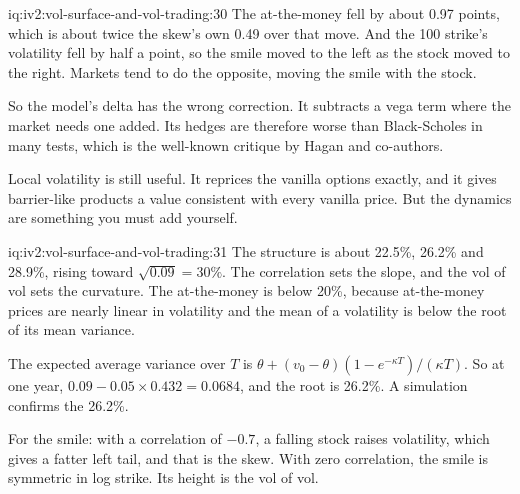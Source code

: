 \begin{solution}{iq:iv2:vol-surface-and-vol-trading:30}
The at-the-money fell by about 0.97 points, which is about twice the skew's own 0.49 over that move. And the 100 strike's volatility fell by half a point, so the smile moved to the left as the stock moved to the right. Markets tend to do the opposite, moving the smile with the stock.

So the model's delta has the wrong correction. It subtracts a vega term where the market needs one added. Its hedges are therefore worse than Black-Scholes in many tests, which is the well-known critique by Hagan and co-authors.

Local volatility is still useful. It reprices the vanilla options exactly, and it gives barrier-like products a value consistent with every vanilla price. But the dynamics are something you must add yourself.

\end{solution}

\begin{solution}{iq:iv2:vol-surface-and-vol-trading:31}
The structure is about 22.5\%, 26.2\% and 28.9\%, rising toward $\sqrt{0.09} = 30\%$. The correlation sets the slope, and the vol of vol sets the curvature. The at-the-money is below 20\%, because at-the-money prices are nearly linear in volatility and the mean of a volatility is below the root of its mean variance.

The expected average variance over $T$ is $\theta + (v_0 - \theta)(1 - e^{-\kappa T})/(\kappa T)$. So at one year, $0.09 - 0.05 \times 0.432 = 0.0684$, and the root is 26.2\%. A simulation confirms the 26.2\%.

For the smile: with a correlation of $-0.7$, a falling stock raises volatility, which gives a fatter left tail, and that is the skew. With zero correlation, the smile is symmetric in log strike. Its height is the vol of vol.

\end{solution}

